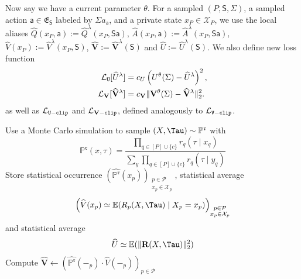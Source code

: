 \documentclass[12pt, a4paper]{article}
\begin{document}
Now say we have a current parameter $\theta$.
For a sampled $(P, \mathsf{S}, \Sigma)$, a sampled action $\mathsf{a}\in\mathfrak{E}_{\mathsf{S}}$ labeled by $\Sigma a_{\mathsf{a}}$, and a private state $x_P \in \mathcal{X}_P$, we use the local aliases $\widehat{Q}(x_P, \mathsf{a}) := \widehat{Q}^\lambda(x_P, \mathsf{S}\mathsf{a})$, $\widehat{A}(x_P, \mathsf{a}) := \widehat{A}^\lambda(x_P, \mathsf{S}\mathsf{a})$, $\widehat{V}(x_P) := \widehat{V}^\lambda(x_P, \mathsf{S})$, $\widehat{\mathbf{V}} := \widehat{\mathbf{V}}^\lambda(\mathsf{S})$ and $\widehat{U} := \widehat{U}^\lambda(\mathsf{S})$.
We also define new loss function
\begin{equation}\label{eq:branched-u-loss}
\begin{aligned}
    \mathcal L_{\tt U}[\widehat{U}^\lambda]
    &= c_U\left(U^\theta(\Sigma) - \widehat{U}^\lambda\right)^2,\\
    \mathcal L_{\mathbf V}[\widehat{\mathbf{V}}^\lambda]
    &= c_{\mathbf V}\|\mathbf{V}^\theta(\Sigma)-\widehat{\mathbf{V}}^\lambda\|_2^2.
\end{aligned}
\end{equation}
as well as $\mathcal L_{\tt U-clip}$ and $\mathcal L_{\mathbf{V}\tt-clip}$, defined analogously to $\mathcal L_{\tt V-clip}$.

\begin{algorithm}[H]
\caption{$(\widehat{\mathbb{P}},\widehat{V},\widehat{\mathbf{V}}, \widehat{U})\gets$~\texttt{PreTerminalMomentMC}$(\mathfrak r)$}
\label{alg:mc-preterminal-moments}
\DontPrintSemicolon
{}
  Use a Monte Carlo simulation to sample $(X,\Tau) \sim \mathbb{P}^{\mathfrak r}$ with
  \[
    \mathbb{P}^{\mathfrak r}(x,\tau)
    =
    \frac{\prod_{q \in [P] \cup \{c\}} r_q(\tau \mid x_q)}
         {\sum_y \prod_{q \in [P] \cup \{c\}} r_q(\tau \mid y_q)}
  \]\;
  Store statistical occurrence $(\widehat{\mathbb{P}^{\mathfrak r}}(x_p))_{\substack{p \in \mathcal{P} \\ x_p \in \mathcal{X}_p}}$, statistical average
  \[
    \left(\widehat{V}(x_p) \simeq \mathbb{E}(R_p(X,\Tau) \mid X_p = x_p)\right)_{\substack{p \in \mathcal{P} \\ x_p \in \mathcal{X}_p}}
  \]
  and statistical average
  \[
    \widehat{U} \simeq \mathbb{E}(\|\mathbf{R}(X,\Tau)\|_2^2)
  \]\;
  Compute $\widehat{\mathbf{V}} \gets \left(\widehat{\mathbb{P}^{\mathfrak r}}(-_p) \cdot \widehat{V}(-_p)\right)_{p \in \mathcal{P}}$\;
\end{algorithm}
\end{document}
